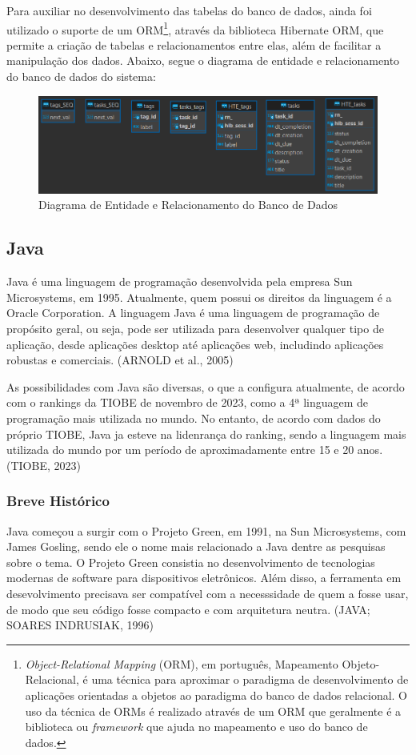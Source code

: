\documentclass[a4paper,12pt]{article}
\begin{document}
Para auxiliar no desenvolvimento das tabelas do banco de dados, ainda foi utilizado o suporte de um ORM\footnote{
	\textit{Object-Relational Mapping} (ORM), em português, Mapeamento Objeto-Relacional, é uma técnica para aproximar o paradigma de desenvolvimento de aplicações orientadas a objetos ao paradigma do banco de dados relacional. O uso da técnica de ORMs é realizado através de um ORM que geralmente é a biblioteca ou \textit{framework} que ajuda no mapeamento e uso do banco de dados.
}, através da biblioteca Hibernate ORM, que permite a criação de tabelas e relacionamentos entre elas, além de facilitar a manipulação dos dados. Abaixo, segue o diagrama de entidade e relacionamento do banco de dados do sistema:
\begin{figure}[H]
	\centering
	\includegraphics[scale=0.80]{database/database-diagram.png}
	\caption{Diagrama de Entidade e Relacionamento do Banco de Dados}
\end{figure}


\subsection{Java}
Java é uma linguagem de programação desenvolvida pela empresa Sun Microsystems, em 1995. Atualmente, quem possui os direitos da 
linguagem é a Oracle Corporation. A linguagem Java é uma linguagem de programação de propósito geral, ou seja, pode ser utilizada 
para desenvolver qualquer tipo de aplicação, desde aplicações desktop até aplicações web, includindo aplicações robustas e comerciais. (ARNOLD et al., 2005)

As possibilidades com Java são diversas, o que a configura atualmente, de acordo com o rankings da TIOBE de novembro de 2023, como a 4ª linguagem de programação
mais utilizada no mundo. No entanto, de acordo com dados do próprio TIOBE, Java ja esteve na lidenrança do ranking, sendo a linguagem mais utilizada do mundo
por um período de aproximadamente entre 15 e 20 anos. (TIOBE, 2023)

\subsubsection{Breve Histórico}
Java começou a surgir com o Projeto Green, em 1991, na Sun Microsystems, com James Gosling, sendo ele o nome mais relacionado a Java dentre as pesquisas 
sobre o tema. O Projeto Green consistia no desenvolvimento de tecnologias modernas de software para dispositivos eletrônicos. Além disso, a ferramenta
em desevolvimento precisava ser compatível com a necesssidade de quem a fosse usar, de modo que seu código fosse compacto e com arquitetura neutra. (JAVA; SOARES INDRUSIAK, 1996)
\end{document}
